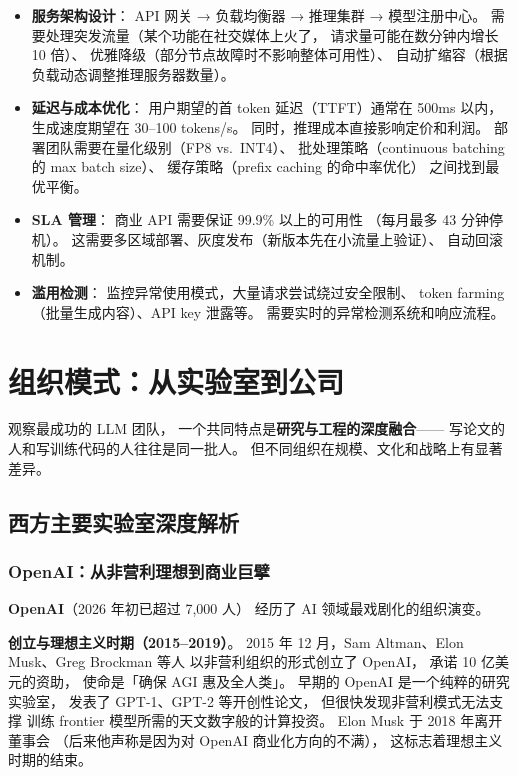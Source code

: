 \begin{itemize}[noitemsep]
  \item \textbf{服务架构设计}：
        API 网关 → 负载均衡器 → 推理集群 → 模型注册中心。
        需要处理突发流量（某个功能在社交媒体上火了，
        请求量可能在数分钟内增长 10 倍）、
        优雅降级（部分节点故障时不影响整体可用性）、
        自动扩缩容（根据负载动态调整推理服务器数量）。
  \item \textbf{延迟与成本优化}：
        用户期望的首 token 延迟（TTFT）通常在 500ms 以内，
        生成速度期望在 30--100 tokens/s。
        同时，推理成本直接影响定价和利润。
        部署团队需要在量化级别（FP8 vs.\ INT4）、
        批处理策略（continuous batching 的 max batch size）、
        缓存策略（prefix caching 的命中率优化）
        之间找到最优平衡。
  \item \textbf{SLA 管理}：
        商业 API 需要保证 99.9\% 以上的可用性
        （每月最多 43 分钟停机）。
        这需要多区域部署、灰度发布（新版本先在小流量上验证）、
        自动回滚机制。
  \item \textbf{滥用检测}：
        监控异常使用模式，大量请求尝试绕过安全限制、
        token farming（批量生成内容）、API key 泄露等。
        需要实时的异常检测系统和响应流程。
\end{itemize}

\section{组织模式：从实验室到公司}

观察最成功的 LLM 团队，
一个共同特点是\textbf{研究与工程的深度融合}——
写论文的人和写训练代码的人往往是同一批人。
但不同组织在规模、文化和战略上有显著差异。

\subsection{西方主要实验室深度解析}
\label{sec:org-labs}

\subsubsection{OpenAI：从非营利理想到商业巨擘}

\textbf{OpenAI}（2026 年初已超过 7,000 人）
经历了 AI 领域最戏剧化的组织演变。

\textbf{创立与理想主义时期（2015--2019）}。
2015 年 12 月，Sam Altman、Elon Musk、Greg Brockman 等人
以非营利组织的形式创立了 OpenAI，
承诺 10 亿美元的资助，
使命是「确保 AGI 惠及全人类」。
早期的 OpenAI 是一个纯粹的研究实验室，
发表了 GPT-1、GPT-2 等开创性论文，
但很快发现非营利模式无法支撑
训练 frontier 模型所需的天文数字般的计算投资。
Elon Musk 于 2018 年离开董事会
（后来他声称是因为对 OpenAI 商业化方向的不满），
这标志着理想主义时期的结束。

